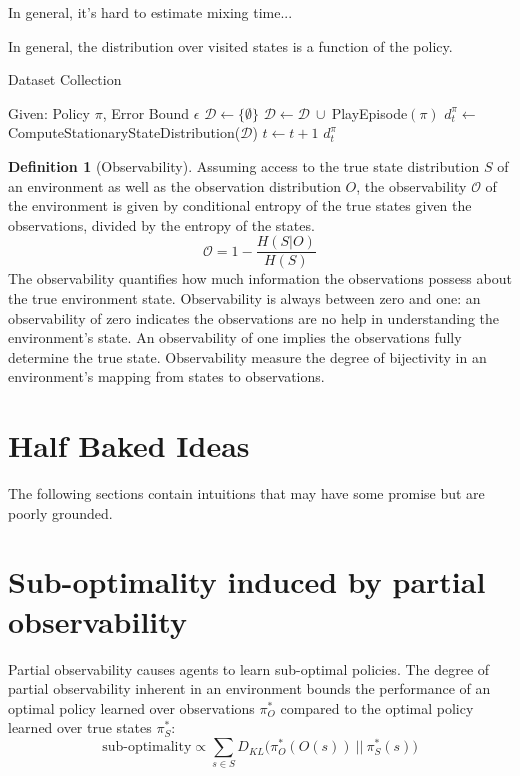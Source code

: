 \documentclass{article} %
\DeclarePairedDelimiter{\norm}{\lVert}{\rVert}
\theoremstyle{definition}
\newtheorem{definition}{Definition}[section]
\begin{document}
In general, it's hard to estimate mixing time...

In general, the distribution over visited states is a function of the
policy.



\begin{algorithm}
\caption{Dataset Collection}
\label{ram-ent}
\begin{algorithmic}
\State Given: Policy $\pi$, Error Bound $\epsilon$
\State $\mathcal{D} \gets \{\emptyset\}$ 
\Do
\State $\mathcal{D} \gets \mathcal{D}\ \cup \ $PlayEpisode$(\pi)$
\State $d^\pi_t \gets \ $ComputeStationaryStateDistribution($\mathcal{D}$)
\State $t\gets t+1$
 
\State \Return $d^\pi_t$
\end{algorithmic}
\end{algorithm}

\begin{definition}[Observability]
Assuming access to the true state distribution $S$ of an environment
as well as the observation distribution $O$, the observability
$\mathcal{O}$ of the environment is given by conditional entropy of
the true states given the observations, divided by the entropy of the
states.
\[
\mathcal{O} = 1 - \frac{H(S|O)}{H(S)}
\]
The observability quantifies how much information the observations
possess about the true environment state. Observability is always
between zero and one: an observability of zero indicates the
observations are no help in understanding the environment's state. An
observability of one implies the observations fully determine the true
state. Observability measure the degree of bijectivity in an
environment's mapping from states to observations.
\end{definition}


\section{Half Baked Ideas}
The following sections contain intuitions that may have some promise
but are poorly grounded.

\section{Sub-optimality induced by partial observability}
Partial observability causes agents to learn sub-optimal policies. The
degree of partial observability inherent in an environment bounds the
performance of an optimal policy learned over observations $\pi_O^*$
compared to the optimal policy learned over true states $\pi_S^*$:
\[
\textrm{sub-optimality} \propto \sum_{s\in S} D_{KL}\big(\pi_O^*(O(s))\ ||\ \pi_S^*(s)\big)
\]



\end{document}
